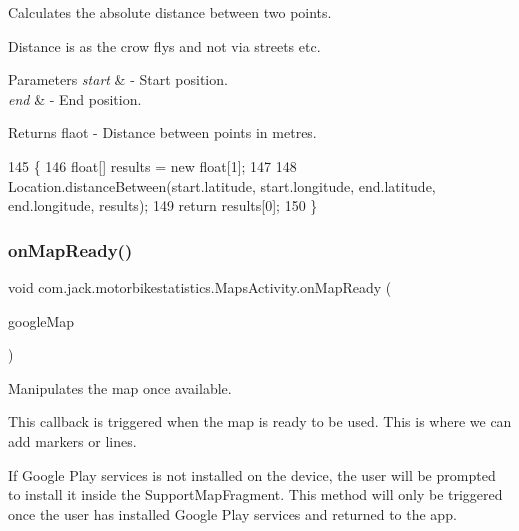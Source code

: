 Calculates the absolute distance between two points. 

Distance is as the crow flys and not via streets etc. 
\begin{DoxyParams}{Parameters}
{\em start} & -\/ Start position. \\
\hline
{\em end} & -\/ End position. \\
\hline
\end{DoxyParams}
\begin{DoxyReturn}{Returns}
flaot -\/ Distance between points in metres. 
\end{DoxyReturn}

\begin{DoxyCode}
145     \{
146         \textcolor{keywordtype}{float}[] results = \textcolor{keyword}{new} \textcolor{keywordtype}{float}[1];
147 
148         Location.distanceBetween(start.latitude, start.longitude, end.latitude, end.longitude, results);
149         \textcolor{keywordflow}{return} results[0];
150     \}
\end{DoxyCode}
\mbox{\label{classcom_1_1jack_1_1motorbikestatistics_1_1_maps_activity_aefa35b548b2f39bb46b2cb5024be383c}} 
\subsubsection{\texorpdfstring{on\+Map\+Ready()}{onMapReady()}}
{\footnotesize\ttfamily void com.\+jack.\+motorbikestatistics.\+Maps\+Activity.\+on\+Map\+Ready (\begin{DoxyParamCaption}\item[{Google\+Map}]{google\+Map }\end{DoxyParamCaption})\hspace{0.3cm}{\ttfamily [inline]}}



Manipulates the map once available. 

This callback is triggered when the map is ready to be used. This is where we can add markers or lines.

If Google Play services is not installed on the device, the user will be prompted to install it inside the Support\+Map\+Fragment. This method will only be triggered once the user has installed Google Play services and returned to the app.


